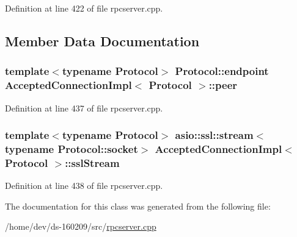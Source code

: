 Definition at line 422 of file rpcserver.\+cpp.



\subsection{Member Data Documentation}
\hypertarget{class_accepted_connection_impl_ade939b7d2778690cf78a9f6719f47c76}{}
\subsubsection[{peer}]{\setlength{\rightskip}{0pt plus 5cm}template$<$typename Protocol$>$ Protocol\+::endpoint {\bf Accepted\+Connection\+Impl}$<$ Protocol $>$\+::peer}\label{class_accepted_connection_impl_ade939b7d2778690cf78a9f6719f47c76}


Definition at line 437 of file rpcserver.\+cpp.

\hypertarget{class_accepted_connection_impl_afcfc99c020d301985bc19b4075fc7e78}{}
\subsubsection[{ssl\+Stream}]{\setlength{\rightskip}{0pt plus 5cm}template$<$typename Protocol$>$ asio\+::ssl\+::stream$<$typename Protocol\+::socket$>$ {\bf Accepted\+Connection\+Impl}$<$ Protocol $>$\+::ssl\+Stream}\label{class_accepted_connection_impl_afcfc99c020d301985bc19b4075fc7e78}


Definition at line 438 of file rpcserver.\+cpp.



The documentation for this class was generated from the following file\+:\begin{DoxyCompactItemize}
\item 
/home/dev/ds-\/160209/src/\hyperlink{rpcserver_8cpp}{rpcserver.\+cpp}\end{DoxyCompactItemize}
